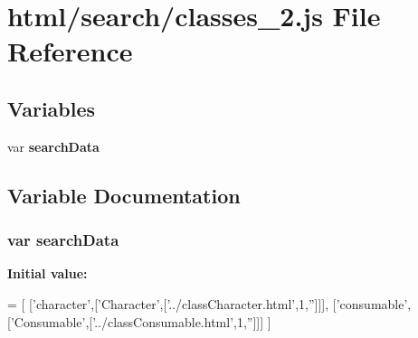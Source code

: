 \section{html/search/classes\-\_\-2.js File Reference}
\label{classes__2_8js}
\subsection*{Variables}
\begin{DoxyCompactItemize}
\item 
var {\bf search\-Data}
\end{DoxyCompactItemize}


\subsection{Variable Documentation}
\subsubsection[{search\-Data}]{\setlength{\rightskip}{0pt plus 5cm}var search\-Data}\label{classes__2_8js_ad01a7523f103d6242ef9b0451861231e}
{\bfseries Initial value\-:}
\begin{DoxyCode}
=
[
  [\textcolor{stringliteral}{'character'},[\textcolor{stringliteral}{'Character'},[\textcolor{stringliteral}{'../classCharacter.html'},1,\textcolor{stringliteral}{''}]]],
  [\textcolor{stringliteral}{'consumable'},[\textcolor{stringliteral}{'Consumable'},[\textcolor{stringliteral}{'../classConsumable.html'},1,\textcolor{stringliteral}{''}]]]
]
\end{DoxyCode}

